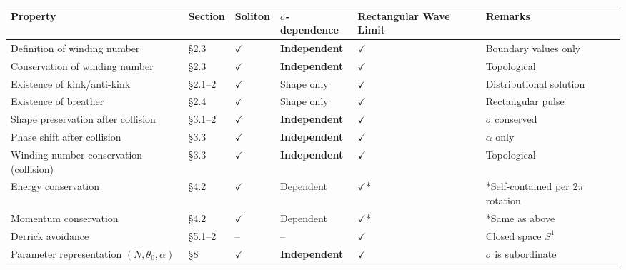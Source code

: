 \documentclass[a4paper,11pt]{article}
\newcounter{none}
\begin{document}
{\def\LTcaptype{none} %
\begin{longtable}[]{@{}
  >{\centering\arraybackslash}p{}
  >{\centering\arraybackslash}p{}
  >{\centering\arraybackslash}p{}
  >{\centering\arraybackslash}p{}
  >{\centering\arraybackslash}p{}
  >{\centering\arraybackslash}p{}@{}}
\toprule\noalign{}
\begin{minipage}[b]{\linewidth}\centering
Property
\end{minipage} & \begin{minipage}[b]{\linewidth}\centering
Section
\end{minipage} & \begin{minipage}[b]{\linewidth}\centering
Soliton
\end{minipage} & \begin{minipage}[b]{\linewidth}\centering
\(\sigma\)-dependence
\end{minipage} & \begin{minipage}[b]{\linewidth}\centering
Rectangular Wave Limit
\end{minipage} & \begin{minipage}[b]{\linewidth}\centering
Remarks
\end{minipage} \\
\midrule\noalign{}
\endhead
\bottomrule\noalign{}
\endlastfoot
Definition of winding number & §2.3 & \(\checkmark\) &
\textbf{Independent} & \(\checkmark\) & Boundary values only \\
Conservation of winding number & §2.3 & \(\checkmark\) &
\textbf{Independent} & \(\checkmark\) & Topological \\
Existence of kink/anti-kink & §2.1--2 & \(\checkmark\) & Shape only &
\(\checkmark\) & Distributional solution \\
Existence of breather & §2.4 & \(\checkmark\) & Shape only &
\(\checkmark\) & Rectangular pulse \\
Shape preservation after collision & §3.1--2 & \(\checkmark\) &
\textbf{Independent} & \(\checkmark\) & \(\sigma\) conserved \\
Phase shift after collision & §3.3 & \(\checkmark\) &
\textbf{Independent} & \(\checkmark\) & \(\alpha\) only \\
Winding number conservation (collision) & §3.3 & \(\checkmark\) &
\textbf{Independent} & \(\checkmark\) & Topological \\
Energy conservation & §4.2 & \(\checkmark\) & Dependent &
\(\checkmark\)* & *Self-contained per \(2\pi\) rotation \\
Momentum conservation & §4.2 & \(\checkmark\) & Dependent &
\(\checkmark\)* & *Same as above \\
Derrick avoidance & §5.1--2 & -- & -- & \(\checkmark\) & Closed space
\(S^1\) \\
Parameter representation \((N, \theta_0, \alpha)\) & §8 & \(\checkmark\)
& \textbf{Independent} & \(\checkmark\) & \(\sigma\) is subordinate \\
\end{longtable}
}
\end{document}
